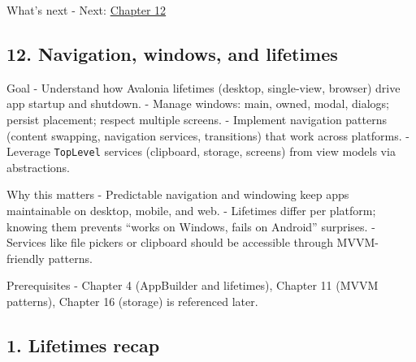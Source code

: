 What's next - Next: \href{Chapter12.md}{Chapter 12}

\newpage

\subsection{12. Navigation, windows, and
lifetimes}\label{navigation-windows-and-lifetimes}

Goal - Understand how Avalonia lifetimes (desktop, single-view, browser)
drive app startup and shutdown. - Manage windows: main, owned, modal,
dialogs; persist placement; respect multiple screens. - Implement
navigation patterns (content swapping, navigation services, transitions)
that work across platforms. - Leverage
\passthrough{\lstinline!TopLevel!} services (clipboard, storage,
screens) from view models via abstractions.

Why this matters - Predictable navigation and windowing keep apps
maintainable on desktop, mobile, and web. - Lifetimes differ per
platform; knowing them prevents ``works on Windows, fails on Android''
surprises. - Services like file pickers or clipboard should be
accessible through MVVM-friendly patterns.

Prerequisites - Chapter 4 (AppBuilder and lifetimes), Chapter 11 (MVVM
patterns), Chapter 16 (storage) is referenced later.

\subsection{1. Lifetimes recap}\label{lifetimes-recap}

